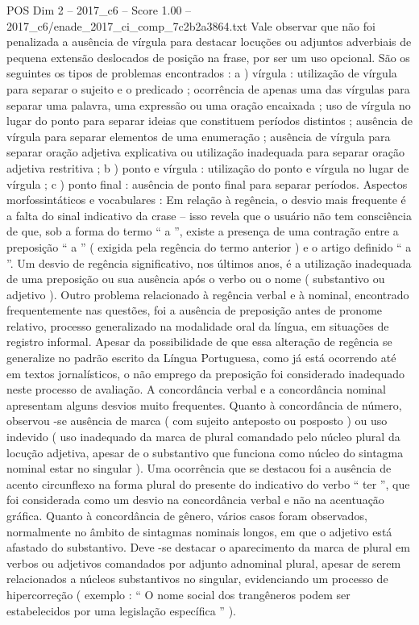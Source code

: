 \begin{textsample}{POS Dim 2 – 2017\_c6 – Score 1.00 – 2017\_c6/enade\_2017\_ci\_comp\_7c2b2a3864.txt}
Vale observar que não foi penalizada a ausência de vírgula para destacar locuções ou adjuntos adverbiais de pequena extensão deslocados de posição na frase, por ser um uso opcional.
São os seguintes os tipos de problemas encontrados : a ) vírgula : utilização de vírgula para separar o sujeito e o predicado ; ocorrência de apenas uma das vírgulas para separar uma palavra, uma expressão ou uma oração encaixada ; uso de vírgula no lugar do ponto para separar ideias que constituem períodos distintos ; ausência de vírgula para separar elementos de uma enumeração ; ausência de vírgula para separar oração adjetiva explicativa ou utilização inadequada para separar oração adjetiva restritiva ; b ) ponto e vírgula : utilização do ponto e vírgula no lugar de vírgula ; c ) ponto final : ausência de ponto final para separar períodos.
Aspectos morfossintáticos e vocabulares : Em relação à regência, o desvio mais frequente é a falta do sinal indicativo da crase – isso revela que o usuário não tem consciência de que, sob a forma do termo “ a ”, existe a presença de uma contração entre a preposição “ a ” ( exigida pela regência do termo anterior ) e o artigo definido “ a ”.
Um desvio de regência significativo, nos últimos anos, é a utilização inadequada de uma preposição ou sua ausência após o verbo ou o nome ( substantivo ou adjetivo ).
Outro problema relacionado à regência verbal e à nominal, encontrado frequentemente nas questões, foi a ausência de preposição antes de pronome relativo, processo generalizado na modalidade oral da língua, em situações de registro informal.
Apesar da possibilidade de que essa alteração de regência se generalize no padrão escrito da Língua Portuguesa, como já está ocorrendo até em textos jornalísticos, o não emprego da preposição foi considerado inadequado neste processo de avaliação.
A concordância verbal e a concordância nominal apresentam alguns desvios muito frequentes.
Quanto à concordância de número, observou -se ausência de marca ( com sujeito anteposto ou posposto ) ou uso indevido ( uso inadequado da marca de plural comandado pelo núcleo plural da locução adjetiva, apesar de o substantivo que funciona como núcleo do sintagma nominal estar no singular ).
Uma ocorrência que se destacou foi a ausência de acento circunflexo na forma plural do presente do indicativo do verbo “ ter ”, que foi considerada como um desvio na concordância verbal e não na acentuação gráfica.
Quanto à concordância de gênero, vários casos foram observados, normalmente no âmbito de sintagmas nominais longos, em que o adjetivo está afastado do substantivo.
Deve -se destacar o aparecimento da marca de plural em verbos ou adjetivos comandados por adjunto adnominal plural, apesar de serem relacionados a núcleos substantivos no singular, evidenciando um processo de hipercorreção ( exemplo : “ O nome social dos trangêneros podem ser estabelecidos por uma legislação específica ” ).

\end{textsample}
